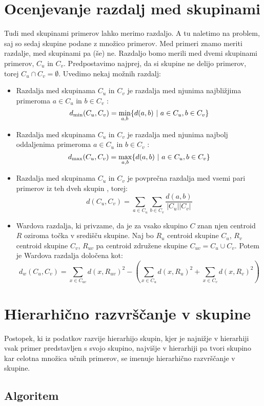 \section{Ocenjevanje razdalj med skupinami}

Tudi med skupinami primerov lahko merimo razdaljo. A tu naletimo na
problem, saj so sedaj skupine podane z množico primerov. Med primeri
znamo meriti razdalje, med skupinami pa (še) ne. Razdaljo bomo merili
med dvemi skupinami primerov, $C_u$ in $C_v$. Predpostavimo najprej,
da si skupine ne delijo primerov, torej $C_u\cap
C_v=\emptyset$. Uvedimo nekaj možnih razdalj:
\begin{itemize}
\item Razdalja med skupinama $C_u$ in $C_v$ je razdalja med njunima
  najbližjima primeroma $a\in C_u$ in $b\in C_v$ :
$$d_{\rm min}(C_u, C_v)=\min_{a,b}\{d(a,b)\ |\ a\in C_u, b\in C_v\}$$
\item Razdalja med skupinama $C_u$ in $C_v$ je razdalja med njunima
  najbolj oddaljenima primeroma $a\in C_u$ in $b\in C_v$
  :
$$d_{\rm max}(C_u, C_v)=\max_{a,b}\{d(a,b)\ |\ a\in C_u, b\in C_v\}$$
\item Razdalja med skupinama $C_u$ in $C_v$ je povprečna razdalja med
  vsemi pari primerov iz teh dveh skupin , torej:
$$d(C_u, C_v)={\sum_{a\in C_u}\sum_{b\in C_v}  \frac{d(a,b)}{|C_u||C_v|}} $$
\item Wardova razdalja, ki privzame, da je za vsako skupino $C$ znan
  njen centroid $R$ oziroma točka v središču skupine. Naj bo $R_u$
  centroid skupine $C_u$, $R_v$
  centroid skupine $C_v$, $R_{uv}$ pa centroid združene skupine
  $C_{uv}=C_u\cup C_v$. Potem je Wardova razdalja določena kot:
$$d_w(C_u, C_v)=\sum_{x\in C_{uv}}d(x, R_{uv})^2 - (\sum_{x\in
    C_u}d(x, R_u)^2 + \sum_{x\in C_v}d(x, R_v)^2)$$
\end{itemize}

\section{Hierarhično razvrščanje v skupine}

Postopek, ki iz podatkov razvije hierarhijo skupin, kjer je najnižje v
hierarhiji vsak primer predstavljen s svojo skupino, najvišje v
hierarhiji pa tvori skupino kar celotna množica učnih primerov, se
imenuje hierarhično razvrščanje v skupine.

\subsection{Algoritem}

